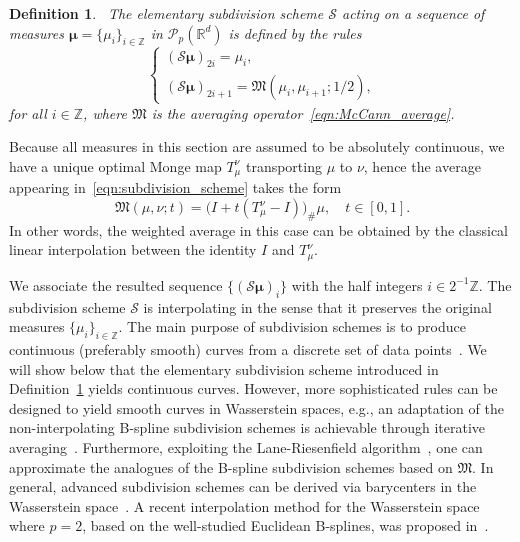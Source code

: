 \documentclass[12pt]{amsart}
\newtheorem{defin}{Definition}[section]
\begin{document}
\begin{defin}~\label{defin:subdivision_scheme}
    The \emph{elementary} subdivision scheme $\mathcal{S}$ acting on a sequence of measures $\boldsymbol{\mu}=\{\mu_i\}_{i\in\mathbb{Z}}$ in $\mathcal{P}_p(\mathbb{R}^d)$ is defined by the rules
    \begin{equation}~\label{eqn:subdivision_scheme}
    \begin{cases}
        (\mathcal{S}\boldsymbol{\mu})_{2i} = \mu_i, \\
        (\mathcal{S}\boldsymbol{\mu})_{2i+1} = \mathfrak{M}(\mu_i, \mu_{i+1}; 1/2),
    \end{cases}
    \end{equation}
    for all $i\in\mathbb{Z}$, where $\mathfrak{M}$ is the averaging operator~\eqref{eqn:McCann_average}.
\end{defin}

Because all measures in this section are assumed to be absolutely continuous, we have a unique optimal Monge map $T_{\mu}^{\nu}$ transporting $\mu$ to $\nu$, hence the average appearing in~\eqref{eqn:subdivision_scheme} takes the form
\begin{equation}~\label{eqn:continuous_McCann_average}
    \mathfrak{M}(\mu, \nu; t) = \big(I+t(T_{\mu}^{\nu}-I)\big)_{\#}\mu, \quad t\in[0, 1].
\end{equation}
In other words, the weighted average in this case can be obtained by the classical linear interpolation between the identity $I$ and $T_{\mu}^{\nu}$.

We associate the resulted sequence $\{(\mathcal{S}\boldsymbol{\mu})_i\}$ with the half integers $i\in 2^{-1}\mathbb{Z}$. The subdivision scheme $\mathcal{S}$ is interpolating in the sense that it preserves the original measures $\{\mu_i\}_{i\in\mathbb{Z}}$. The main purpose of subdivision schemes is to produce continuous (preferably smooth) curves from a discrete set of data points~\cite{dyn2002subdivision}. We will show below that the elementary subdivision scheme introduced in Definition~\ref{defin:subdivision_scheme} yields continuous curves. However, more sophisticated rules can be designed to yield smooth curves in Wasserstein spaces, e.g., an adaptation of the non-interpolating B-spline subdivision schemes is achievable through iterative averaging~\cite{dyn2017manifold}. Furthermore, exploiting the Lane-Riesenfield algorithm~\cite{lane1980theoretical}, one can approximate the analogues of the B-spline subdivision schemes based on $\mathfrak{M}$. In general, advanced subdivision schemes can be derived via barycenters in the Wasserstein space~\cite{agueh2011barycenters}. A recent interpolation method for the Wasserstein space where $p=2$, based on the well-studied Euclidean B-splines, was proposed in~\cite{chewi2021fast}.
\end{document}
